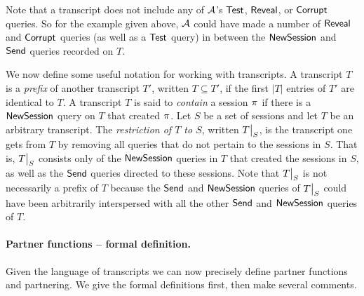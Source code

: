 Note that a transcript does not include any of $\mathcal{A}$'s $\mathsf{Test}$, $\mathsf{Reveal}$, or $\mathsf{Corrupt}$ queries.
So for the example given above, 
$\mathcal{A}$ could have made a number of $\mathsf{Reveal}$ and $\mathsf{Corrupt}$ queries (as well as a $\mathsf{Test}$ query) in between the $\mathsf{NewSession}$ and $\mathsf{Send}$ queries recorded on $T$.

We now define some useful notation for working with transcripts.
A transcript $T$ is a \emph{prefix} of another transcript $T'$,
written $T \subseteq T'$,
if the first $|T|$ entries of $T'$ are identical to $T$.  
A transcript $T$ is said to \emph{contain} a  session $\oracle$ if there is a $\mathsf{NewSession}$ query on $T$ that created $\oracle$.
Let $S$ be a set of sessions and let $T$ be an arbitrary transcript.
The \emph{restriction of $T$ to $S$},
written $\restrict{T}{S}$,
is the transcript one gets from $T$ by removing all queries that do not pertain to the sessions in $S$.
That is, $\restrict{T}{S}$ consists only of the $\mathsf{NewSession}$ queries in $T$ that created the sessions in $S$,
as well as the $\mathsf{Send}$ queries directed to these sessions.
Note that $\restrict{T}{S}$ is not necessarily a prefix of $T$
because the $\mathsf{Send}$ and $\mathsf{NewSession}$ queries of $\restrict{T}{S}$ could have been arbitrarily interspersed with all the other $\mathsf{Send}$ and $\mathsf{NewSession}$ queries of $T$.

\paragraph{Partner functions -- formal definition.}
Given the language of transcripts we can now precisely define partner functions and partnering.
We give the formal definitions first,
then make several comments.


